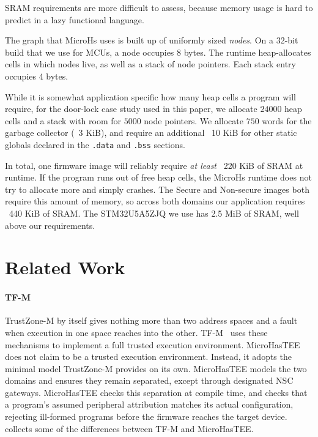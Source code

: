 \documentclass[sigconf]{acmart}
\begin{document}
SRAM requirements are more difficult to assess, because memory usage is hard to predict in a lazy functional language.

The graph that MicroHs uses is built up of uniformly sized \textit{nodes}.
On a 32-bit build that we use for MCUs, a node occupies \(8\) bytes.
The runtime heap-allocates cells in which nodes live, as well as a stack of node pointers.
Each stack entry occupies 4 bytes.

While it is somewhat application specific how many heap cells a program will require, for the door-lock case study used in this paper, we allocate \(24000\) heap cells and a stack with room for \(5000\) node pointers.
We allocate \(750\) words for the garbage collector (~3 KiB), and require an additional ~10 KiB for other static globals declared in the \texttt{.data} and \texttt{.bss} sections.

In total, one firmware image will reliably require \textit{at least} ~220 KiB of SRAM at runtime.
If the program runs out of free heap cells, the MicroHs runtime does not try to allocate more and simply crashes.
The Secure and Non-secure images both require this amount of memory, so across both domains our application requires ~440 KiB of SRAM.
The STM32U5A5ZJQ we use has 2.5 MiB of SRAM, well above our requirements.

\section{Related Work}

\paragraph{TF-M}
TrustZone-M by itself gives nothing more than two address spaces and a fault when execution in one space reaches into the other.
TF-M~\cite{tfm} uses these mechanisms to implement a full trusted execution environment.
MicroHasTEE does not claim to be a trusted execution environment.
Instead, it adopts the minimal model TrustZone-M provides on its own.
MicroHasTEE models the two domains and ensures they remain separated, except through designated NSC gateways.
MicroHasTEE checks this separation at compile time, and checks that a program's assumed peripheral attribution matches its actual configuration, rejecting ill-formed programs before the firmware reaches the target device.
 collects some of the differences between TF-M and MicroHasTEE.
\end{document}

